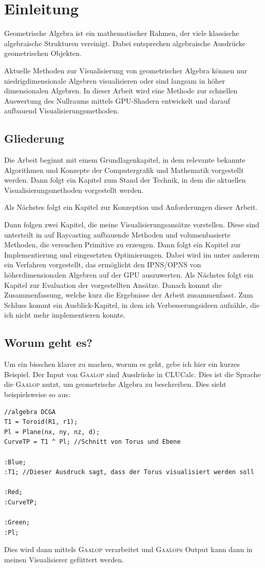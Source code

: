 \documentclass[
	ngerman,%
	accentcolor=9c,%
	ruledheaders=section,%
	class=report,%
	thesis={type=bachelor},%
	fontsize=11pt,%
	parskip=half-,%
	custommargins=true,%
	marginpar=false,%
]{tudapub}
\begin{document}
\chapter{Einleitung}
Geometrische Algebra ist ein mathematischer Rahmen, der viele klassische algebraische Strukturen vereinigt. Dabei entsprechen algebraische Ausdrücke geometrischen Objekten.

Aktuelle Methoden zur Visualisierung von geometrischer Algebra können nur niedrigdimensionale Algebren visualisieren oder sind langsam in höher dimensionalen Algebren.
In dieser Arbeit wird eine Methode zur schnellen Auswertung des Nullraums mittels GPU-Shadern entwickelt und darauf aufbauend Visualisierungsmethoden.



\section{Gliederung}
Die Arbeit beginnt mit einem Grundlagenkapitel, in dem relevante bekannte Algorithmen und Konzepte der Computergrafik und Mathematik vorgestellt werden. Dann folgt ein Kapitel zum Stand der Technik, in dem die aktuellen Visualisierungsmethoden vorgestellt werden.

Als Nächstes folgt ein Kapitel zur Konzeption und Anforderungen dieser Arbeit.

Dann folgen zwei Kapitel, die meine Visualisierungsansätze vorstellen. Diese sind unterteilt in auf Raycasting aufbauende Methoden und volumenbasierte Methoden, die versuchen Primitive zu erzeugen. Dann folgt ein Kapitel zur Implementierung und eingesetzten Optimierungen. Dabei wird im unter anderem ein Verfahren vorgestellt, das ermöglicht den IPNS/OPNS von höherdimensionalen Algebren auf der GPU auszuwerten.
Als Nächstes folgt ein Kapitel zur Evaluation der vorgestellten Ansätze.
Danach kommt die Zusammenfassung, welche kurz die Ergebnisse der Arbeit zusammenfasst.
Zum Schluss kommt ein Ausblick-Kapitel, in dem ich Verbesserungsideen aufzähle, die ich nicht mehr implementieren konnte.
\section{Worum geht es?}
Um ein bisschen klarer zu machen, worum es geht, gebe ich hier ein kurzes Beispiel.
Der Input von \textsc{Gaalop} sind Ausdrücke in CLUCalc. Dies ist die Sprache die \textsc{Gaalop} nutzt, um geometrische Algebra zu beschreiben. 
Dies sieht beispielsweise so aus:
\begin{verbatim}
//algebra DCGA
T1 = Toroid(R1, r1);                
Pl = Plane(nx, ny, nz, d);    
CurveTP = T1 ^ Pl; //Schnitt von Torus und Ebene                

:Blue;
:T1; //Dieser Ausdruck sagt, dass der Torus visualisiert werden soll

:Red;
:CurveTP;

:Green;
:Pl;     
\end{verbatim}
Dies wird dann mittels \textsc{Gaalop} verarbeitet und \textsc{Gaalop}s Output kann dann in meinen Visualisierer gefüttert werden.
\end{document}
